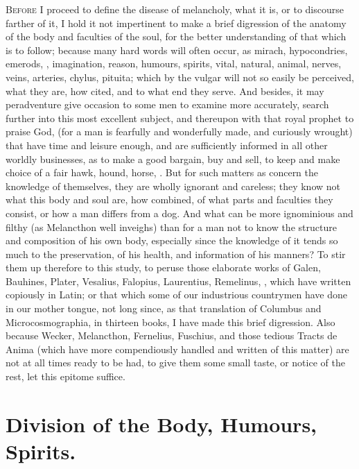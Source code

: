 {\lettrine{B}{efore} I proceed to define the disease of melancholy, what it is, or to
discourse farther of it, I hold it not impertinent to make a brief
digression of the anatomy of the body and faculties of the soul, for
the better understanding of that which is to follow; because many hard
words will often occur, as mirach, hypocondries, emerods, \etc{},
imagination, reason, humours, spirits, vital, natural, animal, nerves,
veins, arteries, chylus, pituita; which by the vulgar will not so
easily be perceived, what they are, how cited, and to what end they
serve. And besides, it may peradventure give occasion to some men to
examine more accurately, search further into this most excellent
subject, and thereupon with that royal prophet to praise God, (for
a man is fearfully and wonderfully made, and curiously wrought) that
have time and leisure enough, and are sufficiently informed in all
other worldly businesses, as to make a good bargain, buy and sell, to
keep and make choice of a fair hawk, hound, horse, \etc{}. But for such
matters as concern the knowledge of themselves, they are wholly
ignorant and careless; they know not what this body and soul are, how
combined, of what parts and faculties they consist, or how a man
differs from a dog. And what can be more ignominious and filthy (as
Melancthon well inveighs) than for a man not to know the structure
and composition of his own body, especially since the knowledge of it
tends so much to the preservation, of his health, and information of
his manners? To stir them up therefore to this study, to peruse those
elaborate works of Galen, Bauhines, Plater, Vesalius, Falopius,
Laurentius, Remelinus, \etc{}, which have written copiously in Latin; or
that which some of our industrious countrymen have done in our mother
tongue, not long since, as that translation of Columbus and 
Microcosmographia, in thirteen books, I have made this brief
digression. Also because Wecker, Melancthon, Fernelius,
 Fuschius, and those tedious Tracts de Anima (which have more
compendiously handled and written of this matter) are not at all times
ready to be had, to give them some small taste, or notice of the rest,
let this epitome suffice.

\section[Division of the Body]{Division of the Body, Humours, Spirits.}

}
